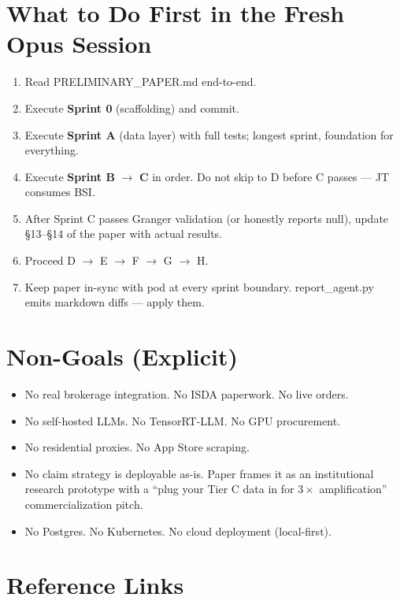 \documentclass[11pt]{article}
\newcommand{\inlinecode}[1]{{\ttfamily\small #1}}
\begin{document}
\section{What to Do First in the Fresh Opus Session}

\begin{enumerate}
  \item Read \inlinecode{PRELIMINARY\_PAPER.md} end-to-end.
  \item Execute \textbf{Sprint 0} (scaffolding) and commit.
  \item Execute \textbf{Sprint A} (data layer) with full tests; longest sprint, foundation for everything.
  \item Execute \textbf{Sprint B} $\to$ \textbf{C} in order. Do not skip to D before C passes --- JT consumes BSI.
  \item After Sprint C passes Granger validation (or honestly reports null), update \S13--\S14 of the paper with actual results.
  \item Proceed D $\to$ E $\to$ F $\to$ G $\to$ H.
  \item Keep paper in-sync with pod at every sprint boundary. \inlinecode{report\_agent.py} emits markdown diffs --- apply them.
\end{enumerate}

\section{Non-Goals (Explicit)}

\begin{itemize}
  \item No real brokerage integration. No ISDA paperwork. No live orders.
  \item No self-hosted LLMs. No TensorRT-LLM. No GPU procurement.
  \item No residential proxies. No App Store scraping.
  \item No claim strategy is deployable as-is. Paper frames it as an institutional research prototype with a ``plug your Tier C data in for $3\times$ amplification'' commercialization pitch.
  \item No Postgres. No Kubernetes. No cloud deployment (local-first).
\end{itemize}

\section{Reference Links}
\end{document}
